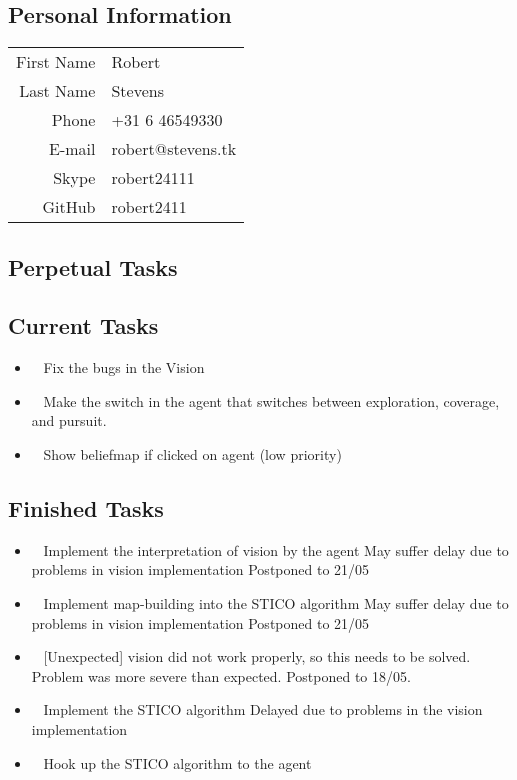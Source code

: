 \subsection{Personal Information}
\begin{table}[h!]
	\begin{tabular}{rl}
	First Name 	& Robert\\
	Last Name	& Stevens\\
	Phone		& +31 6 46549330\\
	E-mail		& robert@stevens.tk\\
	Skype		& robert24111\\
	GitHub		& robert2411
\end{tabular}
\end{table}

\subsection{Perpetual Tasks}

\subsection{Current Tasks}
\begin{itemize}
	\item~
		Fix the bugs in the Vision
	\item~
		Make the switch in the agent that switches between exploration, coverage, and pursuit.
	\item~\marginpar{-}
		Show beliefmap if clicked on agent (low priority)
\end{itemize}

\subsection{Finished Tasks}
\begin{itemize}
	\item~
	Implement the interpretation of vision by the agent
		\subitem May suffer delay due to problems in vision implementation
		\subitem Postponed to 21/05
	\item~
	Implement map-building into the STICO algorithm
		\subitem May suffer delay due to problems in vision implementation
		\subitem Postponed to 21/05
	\item~
	[Unexpected] vision did not work properly, so this needs to be solved.
		\subitem Problem was more severe than expected. Postponed to 18/05.
	\item~
	Implement the STICO algorithm
		\subitem Delayed due to problems in the vision implementation
	\item~
	Hook up the STICO algorithm to the agent
\end{itemize}
